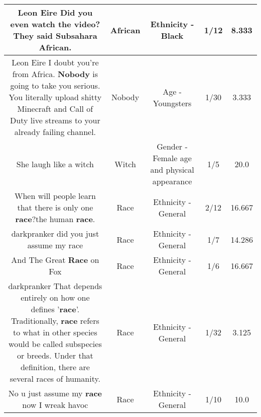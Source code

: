 \documentclass[11pt]{article}
\newlength\mylength
\begin{document}
\begin{center}
\begin{longtable}{|C{.65\mylength}|C{.30\mylength}|C{.12\mylength}|C{.12\mylength}|C{.12\mylength}|}
  \small Leon Eire Did you even watch the video? They said Subsahara \textbf{African}.\normalsize   & African & Ethnicity - Black & 1/12 & 8.333 \\  \hline
  \small Leon Eire I doubt you're from Africa. \textbf{Nobody} is going to take you serious. You literally upload shitty Minecraft and Call of Duty live streams to your already failing channel.\normalsize   & Nobody & Age - Youngsters & 1/30 & 3.333 \\  \hline
  \small She laugh like a witch\normalsize   & Witch & Gender - Female age and physical appearance & 1/5 & 20.0 \\  \hline
  \small When will people learn that there is only one \textbf{race}?the human \textbf{race}.\normalsize   & Race & Ethnicity - General & 2/12 & 16.667 \\  \hline
  \small darkpranker did you just assume my race\normalsize   & Race & Ethnicity - General & 1/7 & 14.286 \\  \hline
  \small And The Great \textbf{Race} on Fox\normalsize   & Race & Ethnicity - General & 1/6 & 16.667 \\  \hline
  \small darkpranker That depends entirely on how one defines '\textbf{race}'. Traditionally, \textbf{race} refers to what in other species would be called subspecies or breeds. Under that definition, there are several races of humanity.\normalsize   & Race & Ethnicity - General & 1/32 & 3.125 \\  \hline
  \small No u just assume my \textbf{race} now I wreak havoc\normalsize   & Race & Ethnicity - General & 1/10 & 10.0 \\  \hline

\end{longtable}
\end{center}
\end{document}
